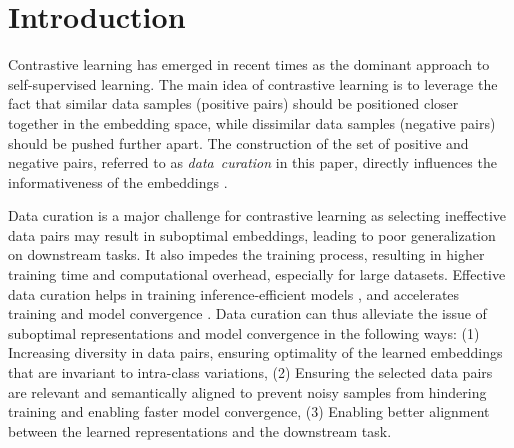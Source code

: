 \section{Introduction}
\label{sec: Intro}

Contrastive learning has emerged in recent times as the dominant approach to self-supervised learning. 
The main idea of contrastive learning is to leverage the fact that similar data samples (positive pairs) should be positioned closer together in the embedding space, while dissimilar data samples (negative pairs) should be pushed further apart. 
The construction of the set of positive and negative pairs, referred to as \mbox{\emph{data curation}} in this paper, directly influences the informativeness of the embeddings \cite{khosla2020supervised,unremix,huynh2022boosting}. 

Data curation is a major challenge for contrastive learning as selecting ineffective data pairs may result in suboptimal embeddings, leading to poor generalization on downstream tasks. It also impedes the training process, resulting in higher training time and computational overhead, especially for large datasets. Effective data curation helps in training inference-efficient models \cite{udandarao2024active,evans2024data}, and accelerates training and model convergence \cite{xu2023cit,zhou2021cupid}.
Data curation can thus alleviate the issue of suboptimal representations and model convergence in the following ways: (1) Increasing diversity in data pairs, ensuring optimality of the learned embeddings that are invariant to intra-class variations, (2) Ensuring the selected data pairs are relevant and semantically aligned to prevent noisy samples from hindering training and enabling faster model convergence, (3) Enabling better alignment between the learned representations and the downstream task.



